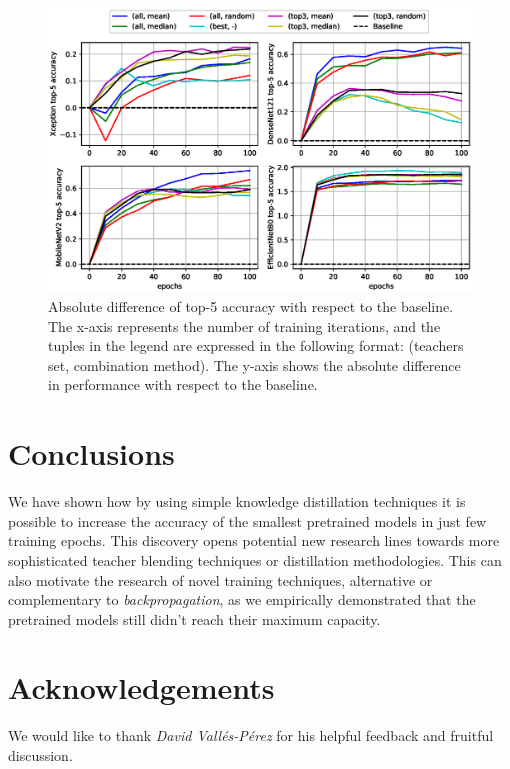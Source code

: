 \documentclass{elsarticle}
\begin{document}
			
	\begin{figure}[h!]
		\centering
		\includegraphics[width=1\linewidth]{img/top5_curves}
		\caption{Absolute difference of top-5 accuracy with respect to the baseline. The x-axis represents the number of training iterations, and the tuples in the legend are expressed in the following format: (teachers set, combination method). The y-axis shows the absolute difference in performance with respect to the baseline.}
		\label{fig:top5curves}
	\end{figure}
	
	\section{Conclusions}  \label{sec:conclusions}
	We have shown how by using simple knowledge distillation techniques it is possible to increase the accuracy of the smallest pretrained models in just few training epochs. This discovery opens potential new research lines towards more sophisticated teacher blending techniques or distillation methodologies. This can also motivate the research of novel training techniques, alternative or complementary to \textit{backpropagation}, as we empirically demonstrated that the pretrained models still didn't reach their maximum capacity.
	
	
	\section{Acknowledgements}
	We would like to thank \textit{David Vallés-Pérez} for his helpful feedback and fruitful discussion.
	\newpage
	
	
	
\end{document}

